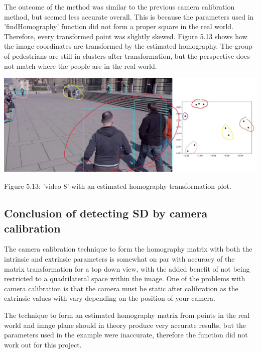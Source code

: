 \documentclass[12pt]{report}
\begin{document}
The outcome of the method was similar to the previous camera calibration method, but seemed less accurate overall. This is because the parameters used in 'findHomography' function did not form a proper square in the real world. Therefore, every transformed point was slightly skewed. Figure 5.13 shows how the image coordinates are transformed by the estimated homography. The group of pedestrians are still in clusters after transformation, but the perspective does not match where the people are in the real world.

\begin{center}
	\includegraphics[width=150mm]{./images/appendix/EstimatedHomographyP.JPG}
	
	{\footnotesize Figure 5.13: 'video 8' with an estimated homography transformation plot.}
\end{center}

\subsection{Conclusion of detecting SD by camera calibration}

The camera calibration technique to form the homography matrix with both the intrinsic and extrinsic parameters is somewhat on par with accuracy of the matrix transformation for a top down view, with the added benefit of not being restricted to a quadrilateral space within the image. One of the problems with camera calibration is that the camera must be static after calibration as the extrinsic values with vary depending on the position of your camera.

\vspace{2mm}

The technique to form an estimated homography matrix from points in the real world and image plane should in theory produce very accurate results, but the parameters used in the example were inaccurate, therefore the function did not work out for this project.

\vspace{2mm}
\end{document}
